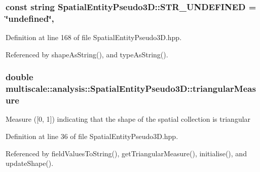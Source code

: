 \hypertarget{classmultiscale_1_1analysis_1_1SpatialEntityPseudo3D_ae4e33ad9bcad430b929b601c5571a6fd}{
\subsubsection[{S\-T\-R\-\_\-\-U\-N\-D\-E\-F\-I\-N\-E\-D}]{\setlength{\rightskip}{0pt plus 5cm}const string Spatial\-Entity\-Pseudo3\-D\-::\-S\-T\-R\-\_\-\-U\-N\-D\-E\-F\-I\-N\-E\-D = \char`\"{}undefined\char`\"{}\hspace{0.3cm}{\ttfamily [static]}, {\ttfamily [protected]}}}\label{classmultiscale_1_1analysis_1_1SpatialEntityPseudo3D_ae4e33ad9bcad430b929b601c5571a6fd}


Definition at line 168 of file Spatial\-Entity\-Pseudo3\-D.\-hpp.



Referenced by shape\-As\-String(), and type\-As\-String().

\hypertarget{classmultiscale_1_1analysis_1_1SpatialEntityPseudo3D_a7e8a7c888b5ab5a204f6d4ffa283709c}{
\subsubsection[{triangular\-Measure}]{\setlength{\rightskip}{0pt plus 5cm}double multiscale\-::analysis\-::\-Spatial\-Entity\-Pseudo3\-D\-::triangular\-Measure\hspace{0.3cm}{\ttfamily [protected]}}}\label{classmultiscale_1_1analysis_1_1SpatialEntityPseudo3D_a7e8a7c888b5ab5a204f6d4ffa283709c}
Measure (\mbox{[}0, 1\mbox{]}) indicating that the shape of the spatial collection is triangular 

Definition at line 36 of file Spatial\-Entity\-Pseudo3\-D.\-hpp.



Referenced by field\-Values\-To\-String(), get\-Triangular\-Measure(), initialise(), and update\-Shape().

